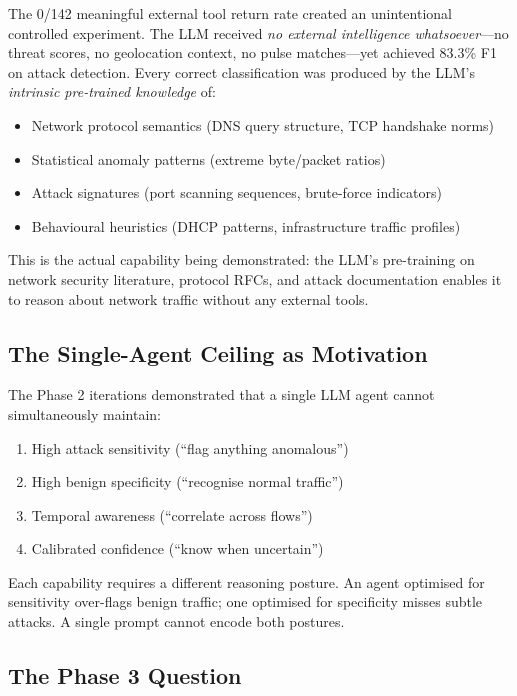 \documentclass[12pt, a4paper, oneside]{report}
\begin{document}
The 0/142 meaningful external tool return rate created an unintentional
controlled experiment. The LLM received \emph{no external intelligence
whatsoever}---no threat scores, no geolocation context, no pulse matches---yet
achieved 83.3\% F1 on attack detection. Every correct classification was
produced by the LLM's \emph{intrinsic pre-trained knowledge} of:

\begin{itemize}
  \item Network protocol semantics (DNS query structure, TCP handshake norms)
  \item Statistical anomaly patterns (extreme byte/packet ratios)
  \item Attack signatures (port scanning sequences, brute-force indicators)
  \item Behavioural heuristics (DHCP patterns, infrastructure traffic profiles)
\end{itemize}

This is the actual capability being demonstrated: the LLM's pre-training
on network security literature, protocol RFCs, and attack documentation
enables it to reason about network traffic without any external tools.

\subsection{The Single-Agent Ceiling as Motivation}

The Phase 2 iterations demonstrated that a single LLM agent cannot
simultaneously maintain:
\begin{enumerate}
  \item High attack sensitivity (``flag anything anomalous'')
  \item High benign specificity (``recognise normal traffic'')
  \item Temporal awareness (``correlate across flows'')
  \item Calibrated confidence (``know when uncertain'')
\end{enumerate}

Each capability requires a different reasoning posture. An agent optimised
for sensitivity over-flags benign traffic; one optimised for specificity
misses subtle attacks. A single prompt cannot encode both postures.

\subsection{The Phase 3 Question}
\end{document}
